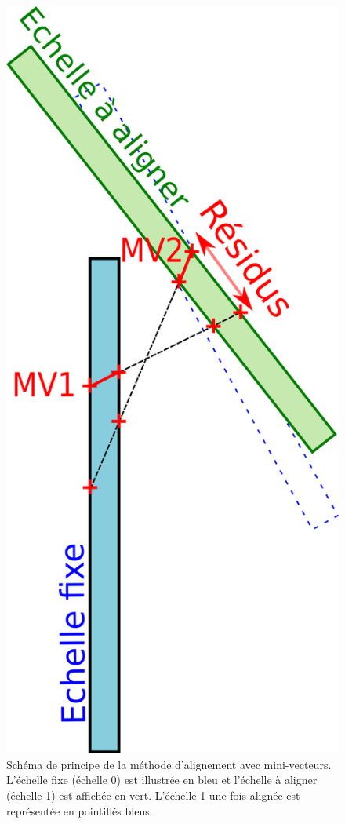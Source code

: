   \begin{figure}[!htb]
    \begin{center}
      \includegraphics[scale=1.25]{./figures/mini_vecteurs-schema.png}
      \caption{Sch\'ema de principe de la m\'ethode d'alignement avec mini-vecteurs. L'\'echelle fixe (\'echelle 0) est illustr\'ee en bleu et l'\'echelle \`a aligner (\'echelle 1) est affich\'ee en vert. L'\'echelle 1 une fois align\'ee est repr\'esent\'ee en pointill\'es bleus.}
      \label{fig:schema_MV}
    \end{center}
  \end{figure}
   
